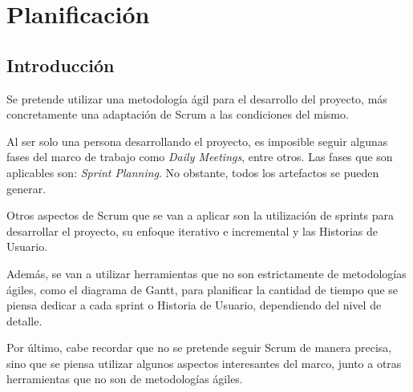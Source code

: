 \chapter{Planificación}

\section{Introducción}

Se pretende utilizar una metodología ágil para el desarrollo del proyecto, más concretamente una adaptación de Scrum a las condiciones del mismo.

\bigskip
Al ser solo una persona desarrollando el proyecto, es imposible seguir algunas fases del marco de trabajo como \textit{Daily Meetings}, entre otros. Las fases que son aplicables son: \textit{Sprint Planning}. No obstante, todos los artefactos se pueden generar.

\bigskip

Otros aspectos de Scrum que se van a aplicar son la utilización de sprints para desarrollar el proyecto, su enfoque iterativo e incremental y las Historias de Usuario.

\bigskip

Además, se van a utilizar herramientas que no son estrictamente de metodologías ágiles, como el diagrama de Gantt, para planificar la cantidad de tiempo que se piensa dedicar a cada sprint o Historia de Usuario, dependiendo del nivel de detalle. 

\bigskip

Por último, cabe recordar que no se pretende seguir Scrum de manera precisa, sino que se piensa utilizar algunos aspectos interesantes del marco, junto a otras herramientas que no son de metodologías ágiles.
